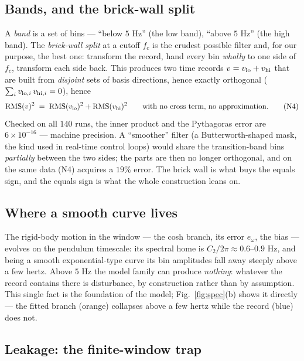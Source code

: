 \documentclass[10pt]{article}
\newcommand{\rms}{\mathrm{RMS}}
\begin{document}
\subsection{Bands, and the brick-wall split}

A \emph{band} is a set of bins --- ``below $5$ Hz'' (the low band),
``above $5$ Hz'' (the high band). The \emph{brick-wall split} at a
cutoff $f_c$ is the crudest possible filter and, for our purpose, the
best one: transform the record, hand every bin \emph{wholly} to one
side of $f_c$, transform each side back. This produces two time
records $v = v_{\rm lo} + v_{\rm hi}$ that are built from
\emph{disjoint} sets of basis directions, hence exactly orthogonal
($\sum_i v_{{\rm lo},i}\,v_{{\rm hi},i} = 0$), hence
\begin{equation}
  \rms(v)^2 \;=\; \rms(v_{\rm lo})^2 + \rms(v_{\rm hi})^2
  \qquad\text{with no cross term, no approximation.}
  \tag{N4}
\end{equation}
Checked on all $140$ runs, the inner product and the Pythagoras error
are $6\times10^{-16}$ --- machine precision. A ``smoother'' filter (a
Butterworth-shaped mask, the kind used in real-time control loops)
would share the transition-band bins \emph{partially} between the two
sides; the parts are then no longer orthogonal, and on the same data
(N4) acquires a $19\%$ error. The brick wall is what buys the equals
sign, and the equals sign is what the whole construction leans on.

\subsection{Where a smooth curve lives}

The rigid-body motion in the window --- the cosh branch, its error
$e_\omega$, the bias --- evolves on the pendulum timescale: its
spectral home is $C_2/2\pi \approx 0.6$--$0.9$ Hz, and being a smooth
exponential-type curve its bin amplitudes fall away steeply above a
few hertz. Above $5$ Hz the model family can produce \emph{nothing}:
whatever the record contains there is disturbance, by construction
rather than by assumption. This single fact is the foundation of the
model; Fig.~\ref{fig:spec}(b) shows it directly --- the fitted branch
(orange) collapses above a few hertz while the record (blue) does
not.

\subsection{Leakage: the finite-window trap}
\end{document}
